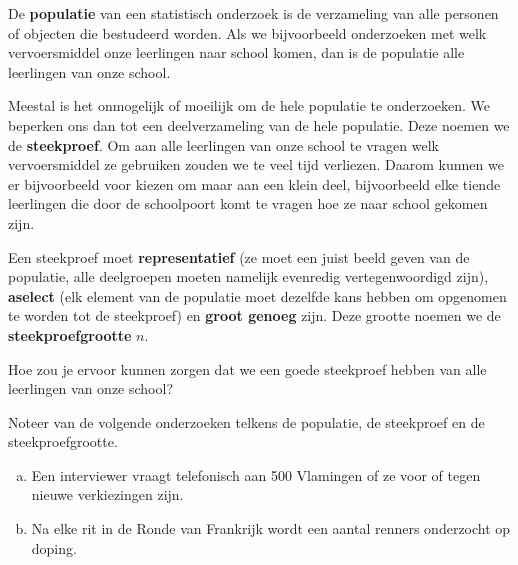 \documentclass[12pt,twoside,a4paper]{article}
\begin{document}
De {\bf populatie} van een statistisch onderzoek is de verzameling van alle personen of objecten die bestudeerd worden. Als we bijvoorbeeld onderzoeken met welk vervoersmiddel onze leerlingen naar school komen, dan is de populatie alle leerlingen van onze school.

Meestal is het onmogelijk of moeilijk om de hele populatie te onderzoeken. We beperken ons dan tot een deelverzameling van de hele populatie. Deze noemen we de {\bf steekproef}. Om aan alle leerlingen van onze school te vragen welk vervoersmiddel ze gebruiken zouden we te veel tijd verliezen. Daarom kunnen we er bijvoorbeeld voor kiezen om maar aan een klein deel, bijvoorbeeld elke tiende leerlingen die door de schoolpoort komt te vragen hoe ze naar school gekomen zijn.

Een steekproef moet {\bf representatief} (ze moet een juist beeld geven van de populatie, alle deelgroepen moeten namelijk evenredig vertegenwoordigd zijn), {\bf aselect} (elk element van de populatie moet dezelfde kans hebben om opgenomen te worden tot de steekproef) en {\bf groot genoeg} zijn. Deze grootte noemen we de {\bf steekproefgrootte} $n$.

\begin{oefening}
Hoe zou je ervoor kunnen zorgen dat we een goede steekproef hebben van alle leerlingen van onze school?
\end{oefening}

\begin{oefening}
Noteer van de volgende onderzoeken telkens de populatie, de steekproef en de steekproefgrootte.
\begin{enumerate}[(a)]
  \item Een interviewer vraagt telefonisch aan 500 Vlamingen of ze voor of tegen nieuwe verkiezingen zijn.
  \item Na elke rit in de Ronde van Frankrijk wordt een aantal renners onderzocht op doping.
\end{enumerate}
\end{oefening}
\end{document}
